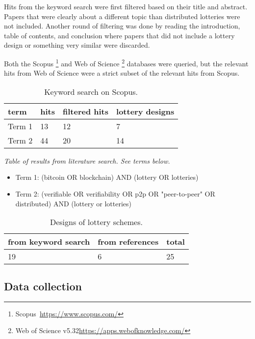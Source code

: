 Hits from the keyword search were first filtered based on their title and abstract. Papers that were clearly about a different topic than distributed lotteries were not included. Another round of filtering was done by reading the introduction, table of contents, and conclusion where papers that did not include a lottery design or something very similar were discarded. 

Both the Scopus \footnote{Scopus~\url{https://www.scopus.com/}} and Web of Science \footnote{Web of Science v5.32\url{https://apps.webofknowledge.com/}} databases were queried, but the relevant hits from Web of Science were a strict subset of the relevant hits from Scopus.

\begin{table}[h]
\centering
\caption{Keyword search on Scopus.}
\begin{tabular}{|l|l|l|l|}
\hline

term & hits & filtered hits & lottery designs \\ \hline
Term 1 & 13 & 12 & 7 \\ \hline
Term 2 & 44 & 20 & 14 \\ \hline

\end{tabular}
\end{table}
\emph{Table of results from literature search. See terms below.}

\begin{itemize}
    \item Term 1: (bitcoin OR blockchain) AND (lottery OR lotteries) 
    \item Term 2: (verifiable OR verifiability OR p2p OR "peer-to-peer" OR distributed) AND (lottery or lotteries)
\end{itemize}

\begin{table}[h]
\centering
\caption{Designs of lottery schemes.}
\begin{tabular}{|l|l|l|}
\hline

from keyword search & from references & total \\ \hline
19 & 6 & 25 \\ \hline

\end{tabular}
\end{table}

\subsection{Data collection}

